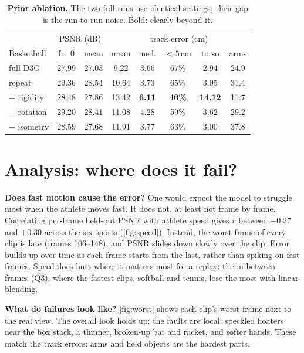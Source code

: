 \documentclass[10pt,twocolumn,letterpaper]{article}
\newcommand{\cm}{\,cm\xspace}
\begin{document}
\begin{table}[t]
\centering\small
\setlength{\tabcolsep}{2.4pt}
\begin{tabular}{lcc|ccccc}
\toprule
& \multicolumn{2}{c|}{PSNR (dB)} & \multicolumn{5}{c}{track error (cm)}\\
Basketball & fr.\ 0 & mean & mean & med. & ${<}5$\cm & torso & arms\\
\midrule
full D3G & 27.99 & 27.03 & 9.22 & 3.66 & 67\% & 2.94 & 24.9\\
\quad repeat & 29.36 & 28.54 & 10.64 & 3.73 & 65\% & 3.05 & 31.4\\
\midrule
$-$ rigidity & 28.48 & 27.86 & 13.42 & \textbf{6.11} & \textbf{40\%} & \textbf{14.12} & 11.7\\
$-$ rotation & 29.20 & 28.41 & 11.08 & 4.28 & 59\% & 3.62 & 29.2\\
$-$ isometry & 28.59 & 27.68 & 11.91 & 3.77 & 63\% & 3.00 & 37.8\\
\bottomrule
\end{tabular}
\vspace{-0.6em}
\caption{\textbf{Prior ablation.} The two full runs use identical settings; their gap is the run-to-run noise. Bold: clearly beyond it.}
\label{tab:priors}
\vspace{-1em}
\end{table}

\section{Analysis: where does it fail?}
\label{sec:analysis}

\noindent\textbf{Does fast motion cause the error?} One would expect the model to struggle most when the athlete moves fast. It does not, at least not frame by frame. Correlating per-frame held-out PSNR with athlete speed gives $r$ between $-0.27$ and $+0.30$ across the six sports (\cref{fig:speed}). Instead, the worst frame of every clip is late (frames 106--148), and PSNR slides down slowly over the clip. Error builds up over time as each frame starts from the last, rather than spiking on fast frames. Speed does hurt where it matters most for a replay: the in-between frames (Q3), where the fastest clips, softball and tennis, lose the most with linear blending.

\noindent\textbf{What do failures look like?} \cref{fig:worst} shows each clip's worst frame next to the real view. The overall look holds up; the faults are local: speckled floaters near the box stack, a thinner, broken-up bat and racket, and softer hands. These match the track errors: arms and held objects are the hardest parts.
\end{document}
